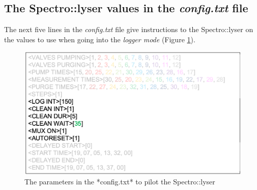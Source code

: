 \documentclass[]{book}
\begin{document}
\hypertarget{the-spectrolyser-values-in-the-config.txt-file}{%
\subsection{\texorpdfstring{The Spectro::lyser values in the \emph{config.txt} file}{The Spectro::lyser values in the config.txt file}}\label{the-spectrolyser-values-in-the-config.txt-file}}

The next five lines in the \emph{config.txt} file give instructions to the Spectro::lyser on the values to use when going into the \emph{logger mode} (Figure \ref{fig:ConfigScan}).

\begin{figure}

\includegraphics[width=0.6\linewidth]{pictures/ConfigScan} \hfill{}

\caption{The parameters in the *config.txt* to pilot the Spectro::lyser}\label{fig:ConfigScan}
\end{figure}
\end{document}
